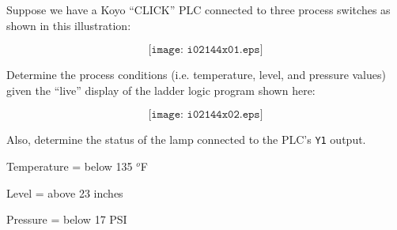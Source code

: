 

Suppose we have a Koyo ``CLICK'' PLC connected to three process switches as shown in this illustration:

$$\texttt{[image: i02144x01.eps]}$$

Determine the process conditions (i.e. temperature, level, and pressure values) given the ``live'' display of the ladder logic program shown here:

$$\texttt{[image: i02144x02.eps]}$$

Also, determine the status of the lamp connected to the PLC's {\tt Y1} output.









Temperature = below 135 $^{o}$F

\vskip 10pt

Level = above 23 inches

\vskip 10pt

Pressure = below 17 PSI











